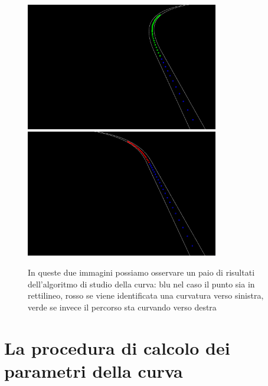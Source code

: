     \begin{figure}[!ht]
        \centering
        \includegraphics[width=0.75\textwidth]{img/pathcurve1}
        \includegraphics[width=0.75\textwidth]{img/pathcurve2}
        \caption[Risultati dell'algoritmo di studio della curva.]{In queste due immagini possiamo osservare un paio di risultati dell'algoritmo di studio della curva: blu nel caso il punto sia in rettilineo, rosso se viene identificata una curvatura verso sinistra, verde se invece il percorso sta curvando verso destra}
    \end{figure}

\section{La procedura di calcolo dei parametri della curva}

